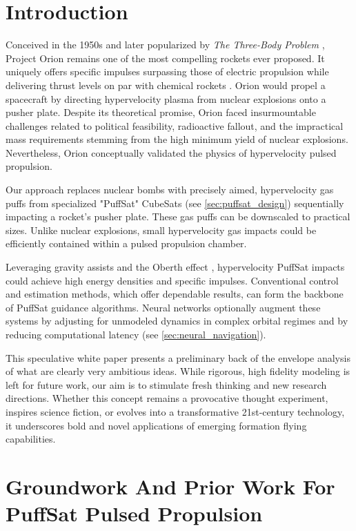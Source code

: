 \documentclass{article}
\begin{document}
\section{Introduction}
Conceived in the 1950s and later popularized by \textit{The Three-Body Problem} \cite{liu2014three}, Project Orion remains one of the most compelling rockets ever proposed. It uniquely offers specific impulses surpassing those of electric propulsion while delivering thrust levels on par with chemical rockets \cite{projorion}.   Orion would propel a spacecraft by directing hypervelocity plasma from nuclear explosions onto a pusher plate. Despite its theoretical promise, Orion faced insurmountable challenges related to political feasibility, radioactive fallout, and the impractical mass requirements stemming from the high minimum yield of nuclear explosions. Nevertheless, Orion conceptually validated the physics of hypervelocity pulsed propulsion.   

Our approach replaces nuclear bombs with precisely aimed, hypervelocity gas puffs from specialized "PuffSat" CubeSats (see \autoref{sec:puffsat_design}) sequentially impacting a rocket's pusher plate. These gas puffs can be downscaled to practical sizes.  Unlike nuclear explosions, small hypervelocity gas impacts could be efficiently contained within a pulsed propulsion chamber.

Leveraging gravity assists and the Oberth effect \cite{oberth_effect}, hypervelocity PuffSat impacts could achieve high energy densities and specific impulses.  Conventional control and estimation methods, which offer dependable results, can form the backbone of PuffSat guidance algorithms.  Neural networks optionally augment these systems by adjusting for unmodeled dynamics in complex orbital regimes and by reducing computational latency (see \autoref{sec:neural_navigation}).  

This speculative white paper presents a preliminary back of the envelope analysis of what are clearly very ambitious ideas. While rigorous, high fidelity modeling is left for future work, our aim is to stimulate fresh thinking and new research directions. Whether this concept remains a provocative thought experiment, inspires science fiction, or evolves into a transformative 21st-century technology, it underscores bold and novel applications of emerging formation flying capabilities. 

\section{Groundwork And Prior Work For PuffSat Pulsed Propulsion}
\end{document}
